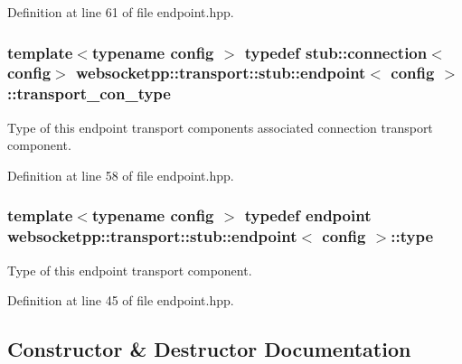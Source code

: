 Definition at line 61 of file endpoint.\+hpp.

\hypertarget{classwebsocketpp_1_1transport_1_1stub_1_1endpoint_a6486b94320ba134cb60a63b4c40194a0}{}
\subsubsection[{transport\+\_\+con\+\_\+type}]{\setlength{\rightskip}{0pt plus 5cm}template$<$typename config $>$ typedef {\bf stub\+::connection}$<$config$>$ {\bf websocketpp\+::transport\+::stub\+::endpoint}$<$ config $>$\+::{\bf transport\+\_\+con\+\_\+type}}\label{classwebsocketpp_1_1transport_1_1stub_1_1endpoint_a6486b94320ba134cb60a63b4c40194a0}
Type of this endpoint transport component\textquotesingle{}s associated connection transport component. 

Definition at line 58 of file endpoint.\+hpp.

\hypertarget{classwebsocketpp_1_1transport_1_1stub_1_1endpoint_af621f6f1f67f9e3eea1e0d28eb5f60ae}{}
\subsubsection[{type}]{\setlength{\rightskip}{0pt plus 5cm}template$<$typename config $>$ typedef {\bf endpoint} {\bf websocketpp\+::transport\+::stub\+::endpoint}$<$ config $>$\+::{\bf type}}\label{classwebsocketpp_1_1transport_1_1stub_1_1endpoint_af621f6f1f67f9e3eea1e0d28eb5f60ae}


Type of this endpoint transport component. 



Definition at line 45 of file endpoint.\+hpp.



\subsection{Constructor \& Destructor Documentation}
\hypertarget{classwebsocketpp_1_1transport_1_1stub_1_1endpoint_a7ff8f4ae45d67a25afc8538ae3d02198}{}
